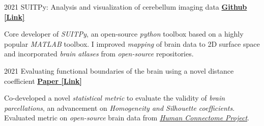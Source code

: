 

\begin{cventries}
    
  \cventry
    {2021} %
  	{SUITPy: Analysis and visualization of cerebellum imaging data} %
  	{\href{https://github.com/DiedrichsenLab/SUITPy}{\textbf{Github [Link]}}}
  	{}
    {
      \begin{cvitems} %
      	\item {Core developer of \textit{SUITPy}, an open-source \textit{python} toolbox based on a highly popular \textit{MATLAB} toolbox. I improved \textit{mapping} of brain data to 2D surface space and incorporated \textit{brain atlases} from \textit{open-source} repositories.}
      \end{cvitems}
    }
    
  \cventry
    {2021} %
    {Evaluating functional boundaries of the brain using a novel distance coefficient} %
    {\href{https://www.biorxiv.org/content/10.1101/2021.05.11.443151v1.full.pdf}{\textbf{Paper [Link]}}}
    {}
    {
      \begin{cvitems} %
        \item {Co-developed a novel \textit{statistical metric} to evaluate the validity of \textit{brain parcellations}, an advancement on \textit{Homogeneity and Silhouette coefficients}. Evaluated metric on \textit{open-source} brain data from \href{http://www.humanconnectomeproject.org/}{\textit{Human Connectome Project}}.}
      \end{cvitems}
    }
    

\end{cventries}
